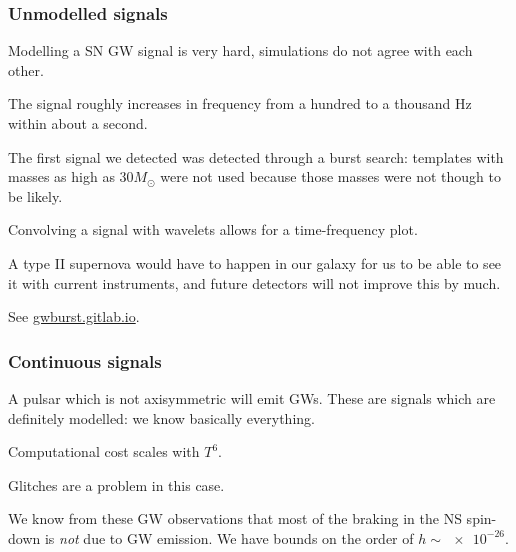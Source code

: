 \documentclass[main.tex]{subfiles}
\begin{document}
\subsubsection{Unmodelled signals}

Modelling a SN GW signal is very hard, simulations do not agree with each other. 

The signal roughly increases in frequency from a  hundred to a thousand Hz within about a second. 

The first signal we detected was detected through a burst search: templates with masses as high as \(30 M_{\odot}\) were not used because those masses were not though to be likely. 

Convolving a signal with wavelets allows for a time-frequency plot. 

A type II supernova would have to happen in our galaxy for us to be able to see it with current instruments, and future detectors will not improve this by much. 

See \url{gwburst.gitlab.io}.

\subsubsection{Continuous signals}

A pulsar which is not axisymmetric will emit GWs. 
These are signals which are definitely modelled: we know basically everything. 

Computational cost scales with \(T^{6}\). 

Glitches are a problem in this case.


We know from these GW observations that 
most of the braking in the NS spin-down is \emph{not} due to GW emission. 
We have bounds on the order of \(h \sim \num{e-26}\). 
\end{document}
